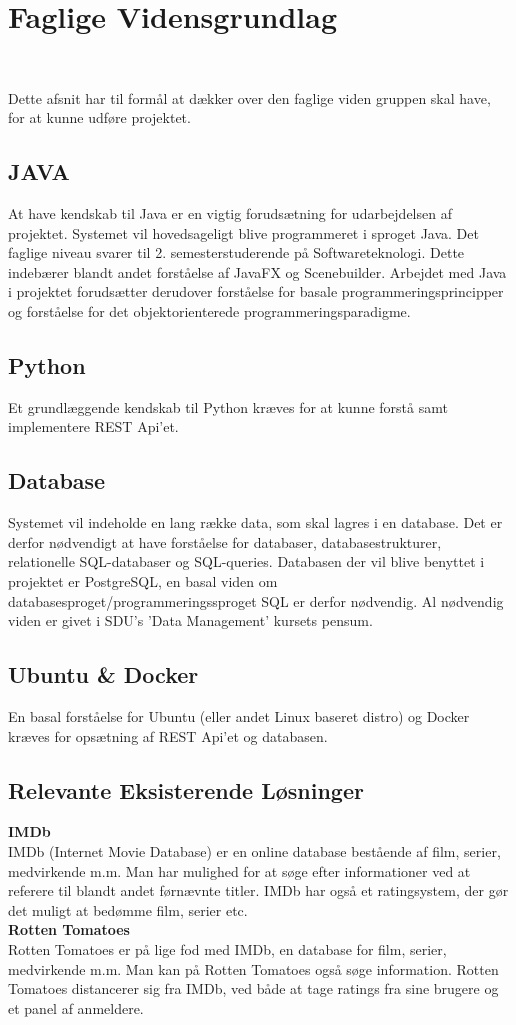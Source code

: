 \section{Faglige Vidensgrundlag}
 \\
\noindent

Dette afsnit har til formål at dækker over den faglige viden gruppen skal have, for at kunne udføre projektet.

\subsection{JAVA}
At have kendskab til Java er en vigtig forudsætning for udarbejdelsen af projektet. Systemet vil hovedsageligt blive programmeret i sproget Java. Det faglige niveau svarer til 2. semesterstuderende på Softwareteknologi. Dette indebærer blandt andet forståelse af JavaFX og Scenebuilder.
Arbejdet med Java i projektet forudsætter derudover forståelse for basale programmeringsprincipper og forståelse for det objektorienterede programmeringsparadigme. 

\subsection{Python}
Et grundlæggende kendskab til Python kræves for at kunne forstå samt implementere REST Api'et.

\subsection{Database}
Systemet vil indeholde en lang række data, som skal lagres i en database. Det er derfor nødvendigt at have forståelse for databaser, databasestrukturer, relationelle SQL-databaser og SQL-queries. Databasen der vil blive benyttet i projektet er PostgreSQL, en basal viden om databasesproget/programmeringssproget SQL er derfor nødvendig. 
Al nødvendig viden er givet i SDU's 'Data Management' kursets pensum.

\subsection{Ubuntu \& Docker}
En basal forståelse for Ubuntu (eller andet Linux baseret distro) og Docker kræves for opsætning af REST Api'et og databasen.

\subsection{Relevante Eksisterende Løsninger}
\textbf{IMDb} \\
IMDb (Internet Movie Database) er en online database bestående af film, serier, medvirkende m.m. Man har mulighed for at søge efter informationer ved at referere til blandt andet førnævnte titler. IMDb har også et ratingsystem, der gør det muligt at bedømme film, serier etc.\\
\textbf{Rotten Tomatoes} \\
Rotten Tomatoes er på lige fod med IMDb, en database for film, serier, medvirkende m.m. Man kan på Rotten Tomatoes også søge information. Rotten Tomatoes distancerer sig fra IMDb, ved både at tage ratings fra sine brugere og et panel af anmeldere. 